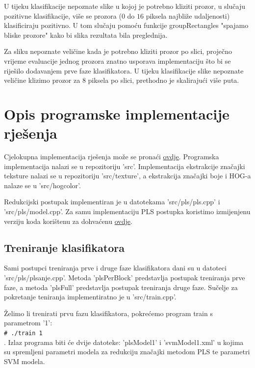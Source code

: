 \documentclass[seminar]{fer}
\newcommand{\shellcmd}[1]{\\\indent\indent\texttt{\footnotesize\# #1}\\}
\begin{document}
U tijeku klasifikacije nepoznate slike u kojoj je potrebno kliziti prozor, u slučaju  pozitivne klasifikacije, više se prozora ($0$ do $16$ piksela najbliže udaljenosti) klasificiraju pozitivno. U tom slučaju pomoću funkcije groupRectangles "spajamo bliske prozore" kako bi slika rezultata bila preglednija.

Za sliku nepoznate veličine kada je potrebno kliziti prozor po slici, proječno vrijeme evaluacije jednog prozora znatno usporava implementaciju što bi se riješilo dodavanjem prve faze klasifikatora. U tijeku klasifikacije slike nepoznate veličine klizimo prozor za $8$ piksela po slici, prethodno je skalirajući više puta.

\chapter{Opis programske implementacije rješenja}

Cjelokupna implementacija rješenja može se pronaći \href{https://github.com/imih/uzorci-projekt}{ovdje}.
Programska implementacija nalazi se u repozitoriju 'src'. Implementacija ekstrakcije značajki teksture nalazi se u repozitoriju 'src/texture', a ekstrakcija značajki boje i HOG-a nalaze se u 'src/hogcolor'. 

Redukcijski postupak implementiran je u datotekama 'src/pls/pls.cpp' i \\ 
'src/pls/model.cpp'. Za samu implementaciju PLS postupka koristimo izmijenjenu verziju koda korištenu za \cite{Schwartz} dohvaćenu   \href{http://homepages.dcc.ufmg.br/~william/softwares.html#PLSNipals}{ovdje}.

\section{Treniranje klasifikatora}

Sami postupci treniranja prve i druge faze klasifikatora dani su u datoteci \\ 'src/pls/plsanje.cpp'. Metoda 'plsPerBlock' predstavlja postupak treniranja prve faze, a metoda 'plsFull' predstavlja postupak treniranja druge faze. Sučelje za pokretanje teniranja implementiratno je u 'src/train.cpp'.	

Želimo li trenirati prvu fazu klasifikatora, pokrećemo program train s parametrom '1': \shellcmd{./train 1}. 
Izlaz programa biti će dvije datoteke: 'plsModel1' i 'svmModel1.xml' u kojima su spremljeni parametri modela za redukciju značajki metodom PLS te parametri SVM modela.
\end{document}
